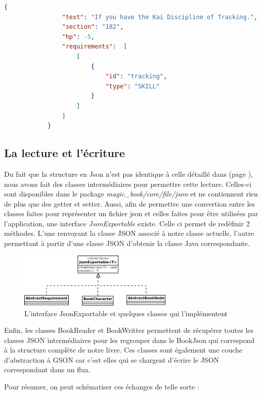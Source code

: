 			\begin{lstlisting}[gobble=12, language=json, caption=Exemple de choix]
			{
				"text": "If you have the Kai Discipline of Tracking.",
				"section": "182",
				"hp": -5,
				"requirements":  [
					[
						{
							"id": "tracking",
							"type": "SKILL"
						}
					]
				]
			}
			\end{lstlisting}

		\subsection{La lecture et l'écriture}
			\label{subsec:lecture_ecriture_fichier}

			Du fait que la structure en Json n'est pas identique à celle détaillé dans  (page \pageref{sec:representation_livre}), nous avons fait des classes intermédiaires pour permettre cette lecture. Celles-ci sont disponibles dans le package \textit{magic\_book/core/file/json} et ne contiennent rien de plus que des getter et setter. Aussi, afin de permettre une convertion entre les classes faites pour représenter un fichier json et celles faites pour être utilisées par l'application, une interface \textit{JsonExportable} existe. Celle ci permet de redéfinir 2 méthodes. L'une renvoyant la classe JSON associé à notre classe actuelle, l'autre permettant à partir d'une classe JSON d'obtenir la classe Java correspondante.

			\begin{figure}[H]
				\centering\includegraphics[width=0.66\textwidth, keepaspectratio]{img/json_exportable.png}
				\caption{L'interface JsonExportable et quelques classes qui l'implémentent}
			\end{figure}

			Enfin, les classes BookReader et BookWritter permettent de récupérer toutes les classes JSON intermédiaires pour les regrouper dans le BookJson qui correspond à la structure complète de notre livre. Ces classes sont également une couche d'abstraction à GSON car c'est elles qui se chargent d'écrire le JSON correspondant dans un flux.

			Pour résumer, on peut schématiser ces échanges de telle sorte :

